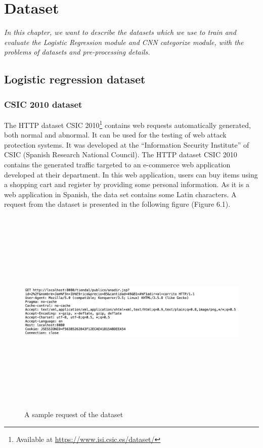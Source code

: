 \chapter{Dataset}
\label{chap:dataset}
	\textit{\hspace{0.5cm}In this chapter, we want to describe the datasets which we use to train and evaluate the Logistic Regression module and CNN categorize module, with the problems of datasets and pre-processing details.}
\minitoc
\section{Logistic regression dataset}
\label{sec:logistic_dataset}
\subsection{CSIC 2010 dataset}
\label{subsec:csic_2010}
\hspace{0.5cm}The HTTP dataset CSIC 2010\footnote{Available at \url{https://www.isi.csic.es/dataset/}} contains web requests automatically generated, both normal and abnormal. It can be used for the testing of web attack protection systems. It was developed at the ``Information Security Institute'' of CSIC (Spanish Research National Council). The HTTP dataset CSIC 2010 contains the generated traffic targeted to an e-commerce web application developed at their department. In this web application, users can buy items using a shopping cart and register by providing some personal information. As it is a web application in Spanish, the data set contains some Latin characters. A request from the dataset is presented in the following figure (Figure 6.1).

\begin{figure}[ht]
	\centering
	\includegraphics[width=\linewidth, height=10cm,keepaspectratio]{figures/dataset1.png}
  \caption{A sample request of the dataset}
\end{figure} 

